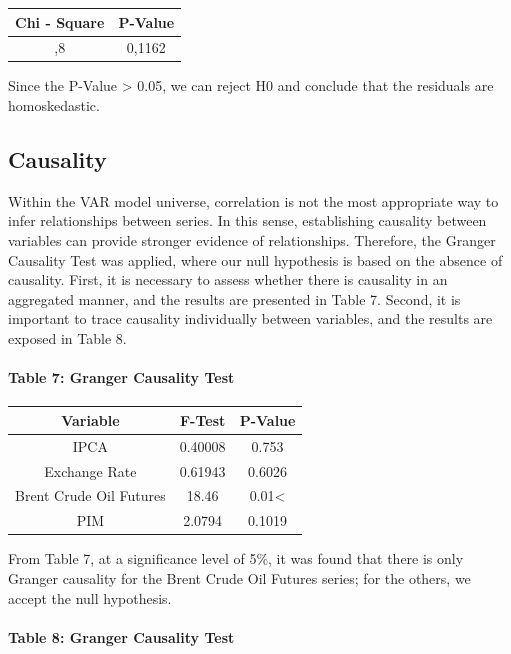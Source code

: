 \documentclass[12pt]{article}
\begin{document}
\begin{longtable}[]{@{}cc@{}}
\toprule\noalign{}
Chi - Square & P-Value \\
\midrule\noalign{}
\endhead
\bottomrule\noalign{}
\endlastfoot
1258,8 & 0,1162 \\
\end{longtable}

Since the P-Value \textgreater{} 0.05, we can reject H0 and conclude
that the residuals are homoskedastic.

\hypertarget{causality}{%
\subsection{Causality}\label{causality}}

Within the VAR model universe, correlation is not the most appropriate
way to infer relationships between series. In this sense, establishing
causality between variables can provide stronger evidence of
relationships. Therefore, the Granger Causality Test was applied, where
our null hypothesis is based on the absence of causality. First, it is
necessary to assess whether there is causality in an aggregated manner,
and the results are presented in Table 7. Second, it is important to
trace causality individually between variables, and the results are
exposed in Table 8.

\hypertarget{table-7-granger-causality-test}{%
\paragraph{Table 7: Granger Causality
Test}\label{table-7-granger-causality-test}}

\begin{longtable}[]{@{}ccc@{}}
\toprule\noalign{}
Variable & F-Test & P-Value \\
\midrule\noalign{}
\endhead
\bottomrule\noalign{}
\endlastfoot
IPCA & 0.40008 & 0.753 \\
Exchange Rate & 0.61943 & 0.6026 \\
Brent Crude Oil Futures & 18.46 & 0.01\textless{} \\
PIM & 2.0794 & 0.1019 \\
\end{longtable}

From Table 7, at a significance level of 5\%, it was found that there is
only Granger causality for the Brent Crude Oil Futures series; for the
others, we accept the null hypothesis.

\hypertarget{table-8-granger-causality-test}{%
\paragraph{Table 8: Granger Causality
Test}\label{table-8-granger-causality-test}}
\end{document}
